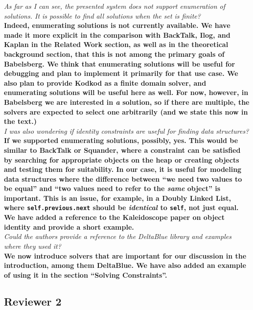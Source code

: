 \documentclass[english]{article}
\begin{document}
\textit{As far as I can see, the presented system does not support
  enumeration of solutions. It is possible to find all
  solutions when the set is finite?}\\
\textbf{Indeed, enumerating solutions is not currently available. We
  have made it more explicit in the comparison with BackTalk, Ilog,
  and Kaplan in the Related Work section, as well as in the
  theoretical background section, that this is not among the primary
  goals of Babelsberg. We think that enumerating solutions will be
  useful for debugging and plan to implement it primarily for that use
  case. We also plan to provide Kodkod as a finite domain solver, and
  enumerating solutions will be useful here as well. For now, however,
  in Babelsberg we are interested in \emph{a} solution, so if there
  are multiple, the solvers are expected to select one arbitrarily
  (and we state this now in the text.)}\\

\textit{I was also wondering if identity constraints are useful for
  finding data structures?}\\
\textbf{If we supported enumerating solutions, possibly, yes. This
  would be similar to BackTalk or Squander, where a constraint can be
  satisfied by searching for appropriate objects on the heap or
  creating objects and testing them for suitability. In our case, it
  is useful for modeling data structures where the difference between
  ``we need two values to be equal'' and ``two values need to refer to
  the \emph{same} object'' is important. This is an issue, for example,
  in a Doubly Linked List, where \lstinline{self.previous.next} should
  be \emph{identical} to \lstinline{self}, not just equal. We have
  added a reference to the Kaleidoscope paper on object identity and
  provide a short example.}\\

\textit{Could the authors provide a reference to the DeltaBlue library
  and examples where they used it?}\\
\textbf{We now introduce solvers that are important for our
  discussion in the introduction, among them DeltaBlue. We have also added
  an example of using it in the section ``Solving Constraints''.}\\

\subsection*{Reviewer 2}
\end{document}

